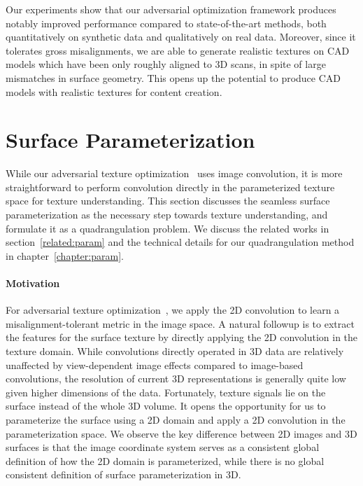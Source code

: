 Our experiments show that our adversarial optimization framework produces notably improved performance compared to state-of-the-art methods, both quantitatively on synthetic data and qualitatively on real data. 
Moreover, since it tolerates gross misalignments, we are able to generate realistic textures on CAD models which have been only roughly aligned to 3D scans, in spite of large mismatches in surface geometry. 
This opens up the potential to produce CAD models with realistic textures for content creation.

\section{Surface Parameterization}
\label{intro:param}
While our adversarial texture optimization~\cite{huang2020adversarial} uses image convolution, it is more straightforward to perform convolution directly in the parameterized texture space for texture understanding. This section discusses the seamless surface parameterization as the necessary step towards texture understanding, and formulate it as a quadrangulation problem. We discuss the related works in section~\ref{related:param} and the technical details for our quadrangulation method in chapter~\ref{chapter:param}.

\paragraph*{Motivation} For adversarial texture optimization~\cite{huang2020adversarial}, we apply the 2D convolution to learn a misalignment-tolerant metric in the image space. A natural followup is to extract the features for the surface texture by directly applying the 2D convolution in the texture domain. While convolutions directly operated in 3D data are relatively unaffected by view-dependent image effects compared to image-based convolutions, the resolution of current 3D representations is generally quite low given higher dimensions of the data. Fortunately, texture signals lie on the surface instead of the whole 3D volume. It opens the opportunity for us to parameterize the surface using a 2D domain and apply a 2D convolution in the parameterization space. We observe the key difference between 2D images and 3D surfaces is that the image coordinate system serves as a consistent global definition of how the 2D domain is parameterized, while there is no global consistent definition of surface parameterization in 3D.

